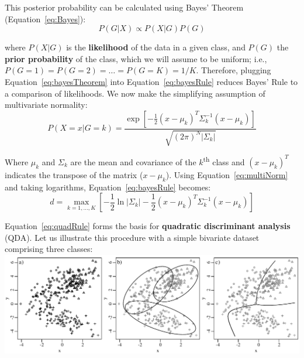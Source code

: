 This posterior probability can be calculated using Bayes' Theorem
(Equation~\ref{eq:Bayes}):
\begin{equation}
  \label{eq:bayesTheorem}
  P(G|X) \propto P(X|G)P(G)
\end{equation}

where $P(X|G)$ is the \textbf{likelihood} of the data in a given
class, and $P(G)$ the \textbf{prior probability} of the class, which
we will assume to be uniform; i.e., $P(G=1)=P(G=2)=\ldots=P(G=K)=1/K$.
Therefore, plugging Equation~\ref{eq:bayesTheorem} into
Equation~\ref{eq:bayesRule} reduces Bayes' Rule to a comparison of
likelihoods.  We now make the simplifying assumption of multivariate
normality:
\begin{equation}
  \label{eq:multiNorm}
  P(X=x|G=k) = \frac{\exp \left[ -\frac{1}{2}(x-\mu_k)^T\Sigma_k^{-1}(x-\mu_k) \right]}{\sqrt{(2\pi)^N|\Sigma_k|}}
\end{equation}

Where $\mu_k$ and $\Sigma_k$ are the mean and covariance of the
$k$\textsuperscript{th} class and $(x-\mu_k)^T$ indicates the
transpose of the matrix ($x-\mu_k$).  Using
Equation~\ref{eq:multiNorm} and taking logarithms,
Equation~\ref{eq:bayesRule} becomes:
\begin{equation}
  \label{eq:quadRule}
  d = \underset{k=1,\ldots,K}{\max}
  \left[-\frac{1}{2}\ln|\Sigma_k| -
    \frac{1}{2}(x-\mu_k)^T\Sigma_k^{-1}(x-\mu_k)\right]
\end{equation}

Equation~\ref{eq:quadRule} forms the basis for \textbf{quadratic
  discriminant analysis} (QDA). Let us illustrate this procedure with
a simple bivariate dataset comprising three classes:\\

\noindent\includegraphics[width=\linewidth]{../figures/QDA.pdf}
\begingroup {}
\label{fig:QDA}\endgroup

